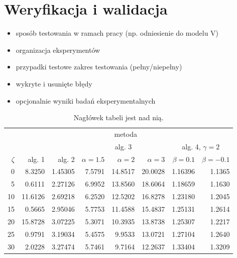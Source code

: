 \documentclass[a4paper,twoside,12pt]{book}
\begin{document}
\chapter{Weryfikacja i walidacja}
\begin{itemize}
\item sposób testowania w ramach pracy (np. odniesienie do modelu V)
\item organizacja eksperymentów
\item przypadki testowe zakres testowania (pełny/niepełny)
\item wykryte i usunięte błędy
\item opcjonalnie wyniki badań eksperymentalnych
\end{itemize}

\begin{table}
\centering
\caption{Nagłówek tabeli jest nad nią.}
\label{id:tab:wyniki}
\begin{tabular}{rrrrrrrr}
\toprule
	         &                                     \multicolumn{7}{c}{metoda}                                      \\
	         \cmidrule{2-8}
	         &         &         &        \multicolumn{3}{c}{alg. 3}        & \multicolumn{2}{c}{alg. 4, $\gamma = 2$} \\
	         \cmidrule(r){4-6}\cmidrule(r){7-8}
	$\zeta$ &     alg. 1 &   alg. 2 & $\alpha= 1.5$ & $\alpha= 2$ & $\alpha= 3$ &   $\beta = 0.1$  &   $\beta = -0.1$ \\
\midrule
	       0 &  8.3250 & 1.45305 &       7.5791 &    14.8517 &    20.0028 & 1.16396 &                       1.1365 \\
	       5 &  0.6111 & 2.27126 &       6.9952 &    13.8560 &    18.6064 & 1.18659 &                       1.1630 \\
	      10 & 11.6126 & 2.69218 &       6.2520 &    12.5202 &    16.8278 & 1.23180 &                       1.2045 \\
	      15 &  0.5665 & 2.95046 &       5.7753 &    11.4588 &    15.4837 & 1.25131 &                       1.2614 \\
	      20 & 15.8728 & 3.07225 &       5.3071 &    10.3935 &    13.8738 & 1.25307 &                       1.2217 \\
	      25 &  0.9791 & 3.19034 &       5.4575 &     9.9533 &    13.0721 & 1.27104 &                       1.2640 \\
	      30 &  2.0228 & 3.27474 &       5.7461 &     9.7164 &    12.2637 & 1.33404 &                       1.3209 \\

\end{tabular}
\end{table}
\end{document}
